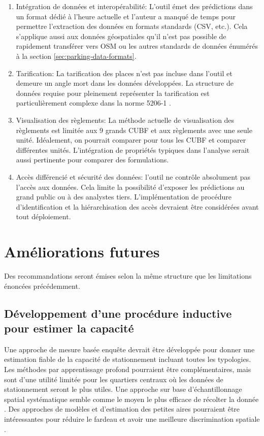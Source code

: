 \begin{enumerate}
            \item Intégration de données et interopérabilité: L'outil émet des prédictions dans un format dédié à l'heure actuelle et l'auteur a manqué de temps pour permettre l'extraction des données en formats standards (CSV, etc.). Cela s'applique aussi aux données géospatiales qu'il n'est pas possible de rapidement transférer vers \ac{OSM} ou les autres standards de données énumérés à la section \ref{sec:parking-data-formats}. 
            \item Tarification: La tarification des places n'est pas incluse dans l'outil et demeure un angle mort dans les données développées. La structure de données requise pour pleinement représenter la tarification est particulièrement complexe dans la norme 5206-1 \parencite{organisation_internationale_de_normalisation_intelligent_2023}. 
            \item Visualisation des règlements: La méthode actuelle de visualisation des règlements est limitée aux 9 grands \ac{CUBF} et aux règlements avec une seule unité. Idéalement, on pourrait comparer pour tous les \ac{CUBF} et comparer différentes unités. L'intégration de propriétés typiques dans l'analyse serait aussi pertinente pour comparer des formulations.
            \item Accès différencié et sécurité des données: l'outil ne contrôle absolument pas l'accès aux données. Cela limite la possibilité d'exposer les prédictions au grand public ou à des analystes tiers. L'implémentation de procédure d'identification et la hiérarchisation des accès devraient être considérées avant tout déploiement.
        \end{enumerate}

\section{Améliorations futures}
    Des recommandations seront émises selon la même structure que les limitations énoncées précédemment.
    \subsection{Développement d'une procédure inductive pour estimer la capacité}
        Une approche de mesure basée enquête devrait être développée pour donner une estimation fiable de la capacité de stationnement incluant toutes les typologies. Les méthodes par apprentissage profond pourraient être complémentaires, mais sont d'une utilité limitée pour les quartiers centraux où les données de stationnement seront le plus utiles. Une approche sur base d'échantillonnage spatial systématique semble comme le moyen le plus efficace de récolter la donnée \parencite{perret_spatially_2022}. Des approches de modèles et d'estimation des petites aires \parencite{sarndal_model_2003,ghosh_small_1994} pourraient être intéressantes pour réduire le fardeau et avoir une meilleure discrimination spatiale \parencite{brus_spatial_2023}.
